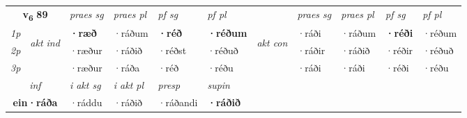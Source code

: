 \noindent
\begin{tabular}{lllllllllll} \toprule
\multicolumn{2}{c}{\textbf{v{\textsubscript{6}}} \Large{\textbf{89}}}  &  \textit{praes sg}  & \textit{praes pl}  &\textit{ pf sg} & \textit{pf pl} &  &  \textit{praes sg}  & \textit{praes pl}  & \textit{pf sg} & \textit{pf pl } \\*
	\cmidrule{3-6} \cmidrule{8-11}
 {\textit{1p}} & \multirow{3}{*}{\begin{turn}{90}\textit{akt ind}\end{turn}} & \textbf{·ræð} & ·ráðum & \textbf{·réð} & \textbf{·réðum} & \multirow{3}{*}{\begin{turn}{90}\textit{akt con}\end{turn}} &·ráði & ·ráðum & \textbf{·réði} & ·réðum\\*
 {\textit{2p}} &  &  ·ræður  & ·ráðið & ·réðst & ·réðuð & & ·ráðir & ·ráðið & ·réðir & ·réðuð \\*
{\textit{3p}} &  & ·ræður & ·ráða & ·réð & ·réðu & & ·ráði & ·ráði& ·réði & ·réðu \\*
\cmidrule{3-6} \cmidrule{8-11}

   \multicolumn{2}{c}{\textit{inf}}  & \textit{i akt sg} & \textit{i akt pl}   & \textit{presp} & \textit{supin}   \\*
  \multicolumn{2}{c}{\textbf{ein\allowbreak ·ráða}} & ·ráddu  & ·ráðið   & ·ráðandi &  \textbf{·ráðið}   \\*
\end{tabular}

